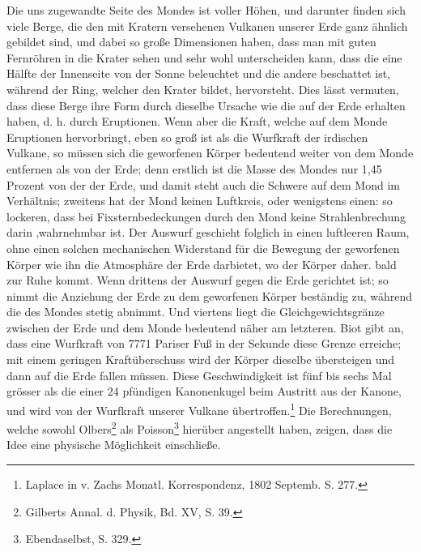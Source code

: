 \documentclass[a4paper, 11pt, oneside]{article}
\begin{document}
Die uns zugewandte Seite des Mondes ist voller Höhen, und darunter finden sich viele Berge, die den mit Kratern versehenen Vulkanen unserer Erde ganz ähnlich gebildet sind, und dabei so große Dimensionen haben, dass man mit guten Fernröhren in die Krater sehen und sehr wohl unterscheiden kann, dass die eine Hälfte der Innenseite von der Sonne beleuchtet und die andere beschattet ist, während der Ring, welcher den Krater bildet, hervorsteht. Dies lässt vermuten, dass diese Berge ihre Form durch dieselbe Ursache wie die auf der Erde erhalten haben, d. h. durch Eruptionen. Wenn aber die Kraft, welche auf dem Monde Eruptionen hervorbringt, eben so groß ist als die Wurfkraft der irdischen Vulkane, so müssen sich die geworfenen Körper bedeutend weiter von dem Monde entfernen als von der Erde; denn erstlich ist die Masse des Mondes nur 1,45 Prozent von der der Erde, und damit steht auch die Schwere auf dem Mond im Verhältnis; zweitens hat der Mond keinen Luftkreis, oder wenigstens einen: so lockeren, dass bei Fixsternbedeckungen durch den Mond keine Strahlenbrechung darin ‚wahrnehmbar ist. Der Auswurf geschieht folglich in einen luftleeren Raum, ohne einen solchen mechanischen Widerstand für die Bewegung der geworfenen Körper wie ihn die Atmosphäre der Erde darbietet, wo der Körper daher. bald zur Ruhe kommt. Wenn drittens der Auswurf gegen die Erde gerichtet ist; so nimmt die Anziehung der Erde zu dem geworfenen Körper beständig zu, während die des Mondes stetig abnimmt. Und viertens liegt die Gleichgewichtsgränze zwischen der Erde und dem Monde bedeutend näher am letzteren. Biot gibt an, dass eine Wurfkraft von 7771 Pariser Fuß in der Sekunde diese Grenze erreiche; mit einem geringen Kraftüberschuss wird der Körper dieselbe übersteigen und dann auf die Erde fallen müssen. Diese Geschwindigkeit ist fünf bis sechs Mal grösser als die einer 24 pfündigen Kanonenkugel beim Austritt aus der Kanone, und wird von der Wurfkraft unserer Vulkane übertroffen.\footnote{Laplace in v. Zachs Monatl. Korrespondenz, 1802 Septemb. S. 277.} Die Berechnungen, welche sowohl Olbers\footnote{Gilberts Annal. d. Physik, Bd. XV, S. 39.} als Poisson\footnote{Ebendaselbst, S. 329.} hierüber angestellt haben, zeigen, dass die Idee eine physische Möglichkeit einschließe.
\end{document}
